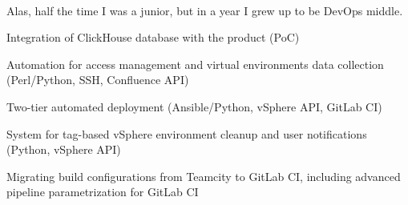 \documentclass[a4paper]{MagicalCV}
\begin{document}
\begin{minipage}[t]{0.645\textwidth}
 \\
\vspace{\topsep} %
Alas, half the time I was a junior, but in a year I grew up to be DevOps middle.
\begin{tightemize}
  \item Integration of ClickHouse database with the product (PoC)
  \item Automation for access management and virtual environments data collection (Perl/Python, SSH, Confluence API)
  \item Two-tier automated deployment (Ansible/Python, vSphere API, GitLab CI)
  \item System for tag-based vSphere environment cleanup and user notifications (Python, vSphere API)
  \item Migrating build configurations from Teamcity to GitLab CI, including advanced pipeline parametrization for GitLab CI
\end{tightemize}
\sectionsep

\end{minipage} 
\end{document}
